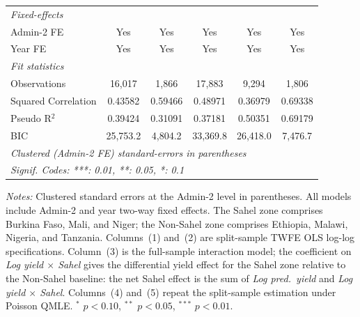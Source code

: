 \begin{tabular}{lccccc}
   \midrule
   \emph{Fixed-effects}\\
   Admin-2 FE                & Yes                     & Yes                 & Yes                                     & Yes                         & Yes\\  
   Year FE                   & Yes                     & Yes                 & Yes                                     & Yes                         & Yes\\  
   \midrule
   \emph{Fit statistics}\\
   Observations              & 16,017                  & 1,866               & 17,883                                  & 9,294                       & 1,806\\  
   Squared Correlation       & 0.43582                 & 0.59466             & 0.48971                                 & 0.36979                     & 0.69338\\  
   Pseudo R$^2$              & 0.39424                 & 0.31091             & 0.37181                                 & 0.50351                     & 0.69179\\  
   BIC                       & 25,753.2                & 4,804.2             & 33,369.8                                & 26,418.0                    & 7,476.7\\  
   \midrule \midrule
   \multicolumn{6}{l}{\emph{Clustered (Admin-2 FE) standard-errors in parentheses}}\\
   \multicolumn{6}{l}{\emph{Signif. Codes: ***: 0.01, **: 0.05, *: 0.1}}\\
\end{tabular}
 
\par \raggedright 
\textit{Notes:} Clustered standard errors at the Admin-2 level in parentheses. All models include Admin-2 and year two-way fixed effects. The Sahel zone comprises Burkina Faso, Mali, and Niger; the Non-Sahel zone comprises Ethiopia, Malawi, Nigeria, and Tanzania. Columns~(1) and~(2) are split-sample TWFE OLS log-log specifications. Column~(3) is the full-sample interaction model; the coefficient on \textit{Log yield $\times$ Sahel} gives the differential yield effect for the Sahel zone relative to the Non-Sahel baseline: the net Sahel effect is the sum of \textit{Log pred.\ yield} and \textit{Log yield $\times$ Sahel}. Columns~(4) and~(5) repeat the split-sample estimation under Poisson QMLE. $^{*}$ $p<0.10$, $^{**}$ $p<0.05$, $^{***}$ $p<0.01$.
\par\endgroup


